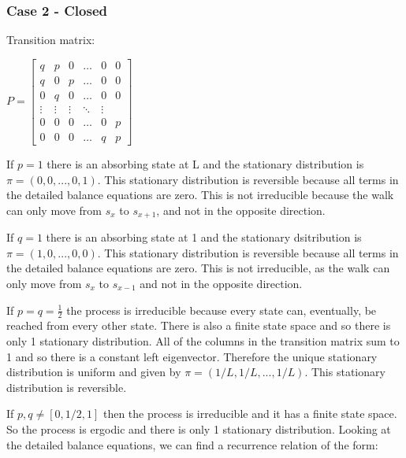 \documentclass{article}
\begin{document}
\subsubsection{Case 2 - Closed}

Transition matrix:

\bigskip

$P = \begin{bmatrix}
    q & p & 0 & \dots  & 0 & 0 \\
    q & 0 & p & \dots  & 0 & 0\\
    0 & q & 0 & \dots  & 0 & 0\\
    \vdots & \vdots & \vdots & \ddots & \vdots \\
    0 & 0 & 0 & \dots & 0 & p \\
    0 & 0 & 0 & \dots & q & p
\end{bmatrix}$

\bigskip

If $p = 1$ there is an absorbing state at L and the stationary distribution is $\pi = (0,0,...,0,1)$. This stationary distribution is reversible because all terms in the detailed balance equations are zero. This is not irreducible because the walk can only move from $s_x$ to $s_{x+1}$, and not in the opposite direction. 

\bigskip

If $q = 1$ there is an absorbing state at 1 and the stationary dsitribution is $\pi = (1,0,...,0,0)$. This stationary distribution is reversible because all terms in the detailed balance equations are zero. This is not irreducible, as the walk can only move from $s_x$ to $s_{x-1}$ and not in the opposite direction. 

\bigskip

If $p = q =\frac{1}{2}$ the process is irreducible because every state can, eventually, be reached from every other state. There is also a finite state space and so there is only 1 stationary distribution. All of the columns in the transition matrix sum to 1 and so there is a constant left eigenvector. Therefore the unique stationary distribution is uniform and given by $\pi = (1/L, 1/L,..., 1/L)$. This stationary distribution is reversible.

\bigskip

If $p,q \neq [0,1/2,1]$ then the process is irreducible and it has a finite state space. So the process is ergodic and there is only 1 stationary distribution. Looking at the detailed balance equations, we can find a recurrence relation of the form:
\end{document}
